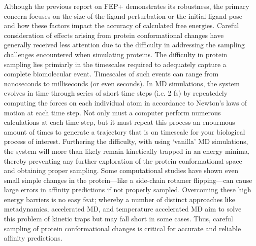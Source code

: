 \documentclass[journal=jctcce,manuscript=article]{achemso}
\begin{document}
Although the previous report on FEP+\cite{FEPplus} demonstrates its robustness, the primary concern focuses on the size of the ligand perturbation or the initial ligand pose and how these factors impact the accuracy of calculated free energies\cite{mobley2012perspective,doi:10.1021/acs.jctc.5b00214}.
Careful consideration of effects arising from protein conformational changes have generally received less attention due to the difficulty in addressing the sampling challenges encountered when simulating proteins.
The difficulty in protein sampling lies primiarly in the timescales required to adequately capture a complete biomolecular event. 
Timescales of such events can range from nanoseconds to milliseconds (or even seconds)\cite{elber2005long}.
In MD simulations, the system evolves in time through series of short time steps (i.e. 2 fs) by repeatedely computing the forces on each individual atom in accordance to Newton's laws of motion at each time step.
Not only must a computer perform numerous calculations at each time step, but it must repeat this process an enourmous amount of times to generate a trajectory that is on timescale for your biological process of interest\cite{karplus2005molecular}.
Furthering the difficulty, with using `vanilla' MD simulations, the system will more than likely remain kinetically trapped in an energy minima, thereby preventing any further exploration of the protein conformational space and obtaining proper sampling.
Some computational studies have shown even small simple changes in the protein---like a side-chain rotamer flipping---can cause large errors in affinity predictions if not properly sampled\cite{Mobley2009489,Mobley20071118,Jiang:2010tg,Meng:2015gj}.
Overcoming these high energy barriers is no easy feat; whereby a number of distinct approaches like metadynamics\cite{laio2002escaping}, accelerated MD\cite{hamelberg2004accelerated}, and temperature accelerated MD\cite{Maragliano2006168} aim to solve this problem of kinetic traps but may fall short in some cases\cite{borhani2012future}.
Thus, careful sampling of protein conformational changes is critical for accurate and reliable affinity predictions. 
\end{document}
